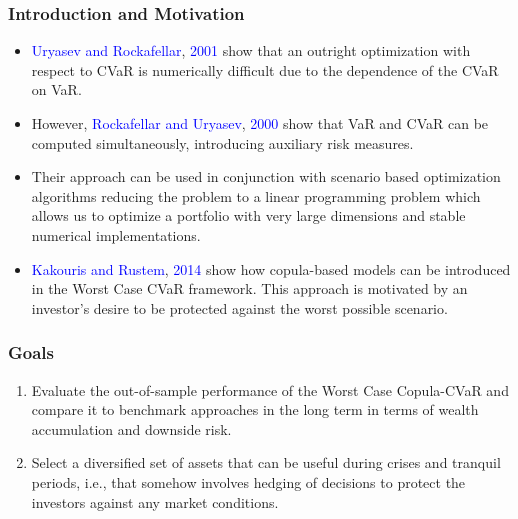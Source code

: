 \documentclass[pdf,10pt,xcolor=dvipsnames,hide notes]{beamer}
\begin{document}
\begin{frame}[label=frame1b]
	\frametitle{Introduction and Motivation}
	
	\begin{itemize}
		\justifying
		
\vspace{0.3cm}

	\item \textcolor{blue}{Uryasev and Rockafellar}, \textcolor{blue}{2001} show that an outright optimization with respect to CVaR is numerically difficult due to the dependence of the
CVaR on VaR. 

\vspace{0.3cm}

	\item However, \textcolor{blue}{Rockafellar and Uryasev}, \textcolor{blue}{2000} show that VaR and CVaR can be	computed simultaneously, introducing auxiliary risk measures. 
	
	\vspace{0.3cm}
	
	\item Their approach can be
	used in conjunction with scenario based optimization algorithms reducing the
	problem to a linear programming problem which allows us to optimize a portfolio with very large dimensions and stable numerical implementations.
	
	\vspace{0.3cm}
	
	\item \textcolor{blue}{Kakouris and Rustem}, \textcolor{blue}{2014} show how copula-based models can be
	introduced in the Worst Case CVaR framework. This approach is
	motivated by an investor's desire to be protected against the worst possible
	scenario.

	
    \end{itemize}

\end{frame}

\begin{frame}[label=frame2]
\frametitle{Goals}

\begin{enumerate}[(1)]
\justifying

\item Evaluate the out-of-sample performance of the Worst Case Copula-CVaR and compare it to benchmark approaches in the long term in terms of wealth accumulation and
downside risk.

\vspace{0.3cm}

\item Select a diversified set of assets that can be
useful during crises and tranquil periods, i.e., that somehow involves hedging of decisions
to protect the investors against any market conditions.

\end{enumerate}

\end{frame}
\end{document}
